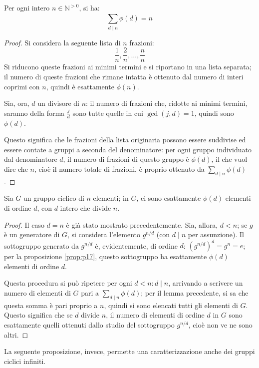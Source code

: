 \documentclass[11pt, a4paper]{scrartcl}
\theoremstyle{definition}
\numberwithin{esempio}{section}
\theoremstyle{definition}
\numberwithin{obs}{section}
\numberwithin{nota}{section}
\numberwithin{equation}{subsection}
\begin{document}
\begin{lemma}
	{}{}
	Per ogni intero $n \in \mathbb{N}^{>0} $, si ha:
	\[
	\sum_{d \mid n}^{} \phi (d) = n
	\] 
	\begin{proof}
		Si considera la seguente lista di $n$ frazioni:
		\[
		\frac{1}{n}, \frac{2}{n},\ldots, \frac{n}{n}
		\] 
		Si riducono queste frazioni ai minimi termini e si riportano in una lista separata; il numero di queste frazioni che rimane intatta \`e ottenuto dal numero di interi coprimi con $n$, quindi \`e esattamente $\phi (n)$.

		Sia, ora, $d$ un divisore di $n$: il numero di frazioni che, ridotte ai minimi termini, saranno della forma $\frac{j}{d}$ sono tutte quelle in cui $\operatorname{gcd}(j,d) =1$, quindi sono $\phi (d)$.

		Questo significa che le frazioni della lista originaria possono essere suddivise ed essere contate a gruppi a seconda del denominatore: per ogni gruppo individuato dal denominatore $d$, il numero di frazioni di questo gruppo \`e $\phi (d)$, il che vuol dire che $n$, cio\`e il numero totale di frazioni, \`e proprio ottenuto da $\sum_{d  \mid n}^{} \phi (d)$.
	\end{proof}
\end{lemma}
\begin{prop}
	{}{}
	Sia $G$ un gruppo ciclico di $n$ elementi; in $G$, ci sono esattamente $\phi  (d)$ elementi di ordine $d$, con $d$ intero che divide $n$.
	\begin{proof}
	Il caso $d=n$ \`e gi\`a stato mostrato precedentemente.
Sia, allora, $d< n$; se $g$ \`e un generatore di $G$, si considera l'elemento $g^{n /d } $ (con $d  \mid n$ per assunzione).
Il sottogruppo generato da $g^{n  /d }  $ \`e, evidentemente, di ordine $d$: $(g^{n /d} )^d = g^n = e$; per la proposizione \ref{prop:p17}, questo sottogruppo ha esattamente $\phi (d)$ elementi di ordine $d$.

Questa procedura si pu\`o ripetere per ogni $d<n : d  \mid n$, arrivando a scrivere un numero di elementi di $G$ pari a $\sum_{d  \mid n}^{} \phi (d)$; per il lemma precedente, si sa che questa somma \`e pari proprio a $n$, quindi si sono elencati tutti gli elementi di $G$.
Questo significa che se $d$ divide $n$, il numero di elementi di ordine $d$ in $G$ sono esattamente quelli ottenuti dallo studio del sottogruppo $g^{ n / d} $, cio\`e non ve ne sono altri.
\end{proof}
\end{prop}
La seguente proposizione, invece, permette una caratterizzazione anche dei gruppi ciclici infiniti.
\end{document}
